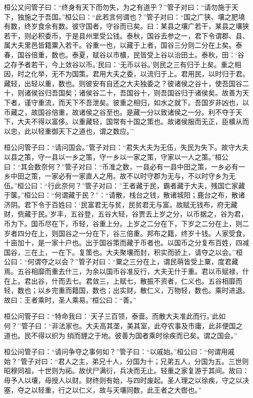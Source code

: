 \documentclass[]{article}
\begin{document}
桓公又问管子曰：``终身有天下而勿失，为之有道乎？''管子对曰：``请勿施于天下，独施之于吾国。''桓公曰：``此若言何谓也？''管子对曰：``国之广狭、壤之肥墝有数，终岁食余有数。彼守国者，守谷而已矣。曰：某县之壤广若干，某县之壤狭若干，则必积委币，于是县州里受公钱。泰秋，国谷去参之一，君下令谓郡、县、属大夫里邑皆籍粟入若干。谷重一也，以藏于上者，国谷三分则二分在上矣。泰春，国谷倍重，数也。泰夏，赋谷以市櫎，民皆受上谷以治田土。泰秋，田：`谷之存予者若干，今上敛谷以币。'民曰：`无币以谷。'则民之三有归于上矣。重之相因，时之化举，无不为国策。君用大夫之委，以流归于上。君用民，以时归于君。藏轻，出轻以重，数也。则彼安有自还之大夫独委之？彼诸侯之谷十，使吾国谷二十，则诸侯谷归吾国矣；诸侯谷二十，吾国谷十，则吾国谷归于诸侯矣。故善为天下者，谨守重流，而天下不吾泄矣。彼重之相归，如水之就下。吾国岁非凶也，以币藏之，故国谷倍重，故诸侯之谷至也。是藏一分以致诸侯之一分。利不夺于天下，大夫不得以富侈。以重藏轻，国常有十国之策也。故诸侯服而无正，臣櫎从而以忠，此以轻重御天下之道也，谓之数应。''

桓公问管子曰：``请问国会。''管子对曰：``君失大夫为无伍，失民为失下。故守大夫以县之策，守一县以一乡之策，守一乡以一家之策，守家以一人之策。''桓公曰：``其会数奈何？''管子对曰：``币准之数，一县必有一县中田之策，一乡必有一乡中田之策，一家必有一家直人之用。故不以时守郡为无与，不以时守乡为无伍。''桓公曰：``行此奈何？''管子对曰：''王者藏于民，霸者藏于大夫，残国亡家藏于箧。''桓公曰：``何谓藏于民？''：``请散，栈台之钱，散诸城阳；鹿台之布，散诸济阴。君下令于百姓曰：`民富君无与贫，民贫君无与富。故赋无钱布，府无藏财，赀藏于民。'岁丰，五谷登，五谷大轻，谷贾去上岁之分，以币据之，谷为君，币为下。国币尽在下，币轻，谷重上分。上岁之二分在下，下岁之二分在上，则二岁者四分在上，则国谷之一分在下，谷三倍重。邦布之籍，终岁十钱。人家受食，十亩加十，是一家十户也。出于国谷策而藏于币者也。以国币之分复布百姓，四减国谷，三在上，一在下。复策也。大夫聚壤而封，积实而骄上，请夺之以会。''桓公曰：``何谓夺之以会？''管子对曰：``粟之三分在上，谓民萌皆受上粟，度君藏焉。五谷相靡而重去什三，为余以国币谷准反行，大夫无什于重。君以币赋禄，什在上。君出谷，什而去七。君敛三，上赋七，散振不资者，仁义也。五谷相靡而轻，数也；以乡完重而籍国，数也；出实财，散仁义，万物轻，数也。乘时进退。故曰：王者乘时，圣人乘易。''桓公曰：``善。''

桓公问管子曰：``特命我曰：`天子三百领，泰啬。而散大夫准此而行。'此如何？''管子曰：``非法家也。大夫高其垄，美其室，此夺农事及市庸，此非便国之道也。民不得以织为绡而貍之于地。彼善为国者乘时徐疾而已矣。谓之国会。''

桓公问管子曰：``请问争夺之事何如？''管子曰：``以戚始。''桓公曰：``何谓用戚始？''管子对曰：``君人之主，弟兄十人，分国为十；兄弟五人，分国为五。三世则昭穆同祖，十世则为祏。故伏尸满衍，兵决而无止。轻重之家复游于其间。故曰：毋予人以壤，毋授人以财。财终则有始，与四时废起。圣人理之以徐疾，守之以决塞，夺之以轻重，行之以仁义，故与天壤同数，此王者之大辔也。''
\end{document}
